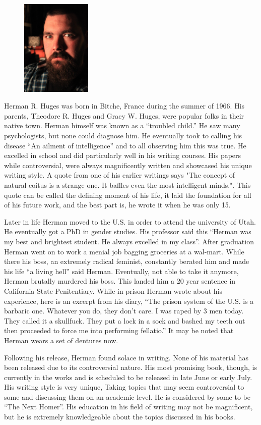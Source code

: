 
\begin{figure}
\includegraphics[width=0.3\textwidth]{images/author-main.jpg}
\end{figure}

Herman R. Huges was born in Bitche, France during the summer of 1966. His
parents, Theodore R. Huges and Gracy W. Huges, were popular folks in their
native town. Herman himself was known as a “troubled child.” He saw many psychologists,
but none could diagnose him. He eventually took to calling his disease “An ailment of
intelligence” and to all observing him this was true. He excelled in school and
did particularly well in his writing courses. His papers while controversial,
were always magnificently written and showcased his unique writing style. A
quote from one of his earlier writings says "The concept of natural coitus is a
strange one. It baffles even the most intelligent minds.". This quote can be
called the defining moment of his life, it laid the foundation for all of his
future work, and the best part is, he wrote it when he was only 15.


       Later in life Herman moved to the U.S. in order to attend the university
of Utah. He eventually got a PhD in gender studies. His professor said this
“Herman was my best and brightest student. He always excelled in my class”. After
graduation Herman went on to work a menial job bagging groceries at a wal-mart.
While there his boss, an extremely radical feminist, constantly berated him and
made his life “a living hell” said Herman. Eventually, not able to take it
anymore, Herman brutally murdered his boss. This landed him a 20 year sentence in
California State Penitentiary. While in prison Herman wrote about his experience,
here is an excerpt from his diary, “The prison system of the U.S. is a barbaric
one. Whatever you do, they don't care. I was raped by 3 men today. They called
it a skullfuck. They put a lock in a sock and bashed my teeth out then proceeded
to force me into performing fellatio.” It may be noted that Herman wears a set
of dentures now.


       Following his release, Herman found solace in writing. None of his
material has been released due to its controversial nature. His most promising
book, though, is currently in the works and is scheduled to be released in late
June or early July. His writing style is very unique, Taking topics that may
seem controversial to some and discussing them on an academic level. He is
considered by some to be “The Next Homer”. His education in his field of writing
may not be magnificent, but he is extremely knowledgeable about the topics
discussed in his books.

